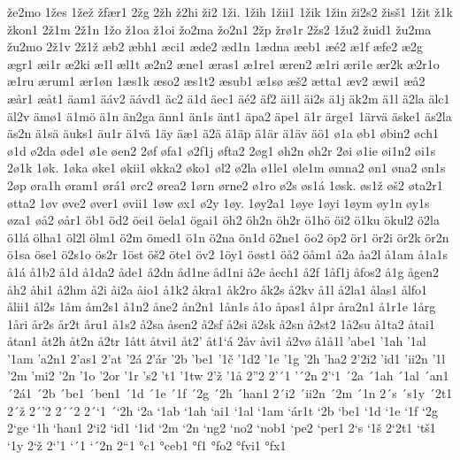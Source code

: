 že2mo
1žes
1žež
žfær1
2žg
2žh
ž2hi
ži2
1ži.
1žih
1žii1
1žik
1žin
ži2s2
žisš1
1žit
ž1k
žkon1
2ž1m
2ž1n
1žo
ž1oa
ž1oi
žo2ma
žo2n1
2žp
žrø1r
2žs2
1žu2
žuid1
žu2ma
žu2mo
2ž1v
2ž1ž
æb2
æbh1
æci1
æde2
æd1n
1ædna
æeb1
æé2
æ1f
æfe2
æ2g
ægr1
æi1r
æ2ki
æ1l
æl1t
æ2n2
æne1
æras1
æ1re1
æren2
æ1ri
æri1e
ær2k
æ2r1o
æ1ru
ærum1
ær1øn
1æs1k
æso2
æs1t2
æsub1
æ1sø
æš2
ætta1
æv2
æwi1
æå2
æår1
æåt1
äam1
äáv2
äávd1
äc2
ä1d
äec1
äé2
äf2
äi1l
äi2s
ä1j
äk2m
ä1l
ä2la
älc1
äl2v
ämø1
ä1mö
ä1n
än2ga
änn1
än1s
änt1
äpa2
äpe1
ä1r
ärge1
1ärvä
äske1
äs2la
äs2n
ä1sä
äuks1
äu1r
ä1vä
1äy
äæ1
ä2ä
ä1äp
ä1är
ä1äv
äö1
ø1a
øb1
øbin2
øch1
ø1d
ø2da
øde1
ø1e
øen2
2øf
øfa1
ø2f1j
øfta2
2øg1
øh2n
øh2r
2øi
ø1ie
øi1n2
øi1s
2ø1k
1øk.
1øka
øke1
økii1
økka2
øko1
øl2
ø2la
ø1le1
øle1m
ømna2
øn1
øna2
øn1s
2øp
øra1h
øram1
ørá1
ørc2
ørea2
1ørn
ørne2
ø1ro
ø2s
øs1á
1øsk.
øs1ž
øš2
øta2r1
øtta2
1øv
øve2
øver1
øvii1
1øw
øx1
ø2y
1øy.
1øy2a1
1øye
1øyi
1øym
øy1n
øy1s
øza1
øå2
øår1
öb1
öd2
öei1
öela1
ögai1
öh2
öh2n
öh2r
ö1hö
öi2
ö1ku
ökul2
ö2la
ö1lá
ölha1
öl2l
ölm1
ö2m
ömed1
ö1n
ö2na
ön1d
ö2ne1
öo2
öp2
ör1
ör2i
ör2k
ör2n
ö1sa
öse1
ö2s1o
ös2r
1öst
öš2
öte1
öv2
1öy1
öøst1
öå2
öåm1
å2a
åa2l
å1am
å1a1s
å1á
å1b2
å1d
å1da2
åde1
å2dn
åd1ne
åd1ni
å2e
åech1
å2f
1åf1j
åfos2
å1g
ågen2
åh2
åhi1
å2hm
å2i
åi2a
åio1
å1k2
åkra1
åk2ro
åk2s
å2kv
å1l
å2la1
ålas1
ålfo1
ålii1
ål2s
1åm
åm2s1
å1n2
åne2
ån2n1
1ån1s
å1o
åpas1
å1pr
åra2n1
å1r1e
1årg
1åri
år2s
år2t
åru1
å1s2
å2sa
åsen2
å2sf
å2si
å2sk
å2sn
å2st2
1å2su
å1ta2
åtai1
åtan1
åt2h
åt2n
å2tr
1ått
åtvi1
åt2'
åt1`á
2åv
åvi1
å2vø
å1å1l
'abe1
'1ah
'1al
'1am
'a2n1
2'as1
2'at
'2á
2'ár
'2b
'be1
'1č
'1d2
'1e
'1g
'2h
'ha2
2'2i2
'id1
'ii2n
'1l
'2m
'mi2
'2n
'1o
'2or
'1r
's2
't1
'1tw
2'ž
'1å
2''2
2'´1
'´2n
2'`1
´2a
´1ah
´1al
´an1
´2á1
´2b
´be1
´ben1
´1d
´1e
´1f
´2g
´2h
´han1
2´i2
´ii2n
´2m
´1n
2´s
´s1y
´2t1
2´ž
2´'2
2´´2
2´`1
´`2h
`2a
`1ab
`1ah
`ai1
`1al
`1am
`ár1t
`2b
`be1
`1d
`1e
`1f
`2g
2`ge
`1h
`han1
2`i2
`id1
`1iđ
`2m
`2n
`ng2
`no2
`nob1
`pe2
`per1
2`s
`1š
2`2t1
`tš1
`1y
2`ž
2`'1
`´1
`´2n
2``1
°c1
°ceb1
°f1
°fo2
°fvi1
°fx1
